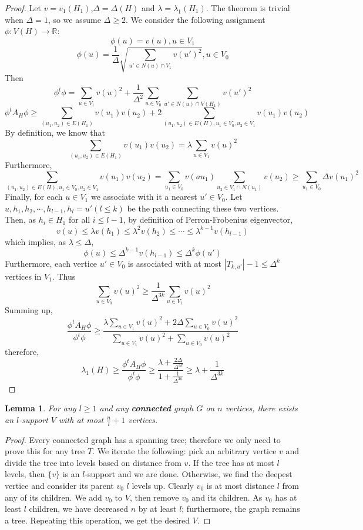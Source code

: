 \documentclass{article}
\theoremstyle{definition} %
\theoremstyle{plain} %
\newtheorem{lemma}{Lemma}
\begin{document}
\begin{proof}
Let $v = v_1(H_1)$,$\Delta = \Delta(H)$ and $\lambda = \lambda_1(H_1)$. The theorem is trivial when $\Delta = 1$, so we assume $\Delta\geq 2$. We consider the following assignment $\phi:V(H) \to\mathbb{R}$:
$$\phi(u) = v(u), u\in V_1$$
$$\phi(u) = \frac{1}{\Delta}\sqrt{\sum_{u'\in N(u)\cap V_1}v(u')^2}, u\in V_0$$
Then
$$\phi^t\phi = \sum_{u\in V_1}v(u)^2 + \frac{1}{\Delta^2}\sum_{u\in V_0}\sum_{u'\in N(u)\cap V(H_1)}v(u')^2$$
$$\phi^tA_H\phi \geq \sum_{(u_1,u_2)\in E(H_1)} v(u_1)v(u_2) + 2\sum_{(u_1,u_2)\in E(H),u_1\in V_0, u_2\in V_1}v(u_1)v(u_2)$$
By definition, we know that 
$$\sum_{(u_1,u_2)\in E(H_1)} v(u_1)v(u_2) = \lambda\sum_{u\in V_1}v(u)^2 $$
Furthermore,
$$\sum_{(u_1,u_2)\in E(H),u_1\in V_0, u_2\in V_1}v(u_1)v(u_2) = \sum_{u_1\in V_0}v(a u_1)\sum_{u_2\in V_1\cap N(u_1)}v(u_2)\geq  \sum_{u_1\in V_0}\Delta v(u_1)^2$$
Finally, for each $u\in V_1$ we associate with it a nearest $u'\in V_0$. Let $u, h_1,h_2,\cdots, h_{l-1}, h_l = u'(l\leq k)$ be the path connecting these two vertices. Then, as $h_i \in H_1$ for all $i \leq {l-1}$, by definition of Perron-Frobenius eigenvector,
$$v(u) \leq\lambda v(h_1) \leq \lambda^2v(h_2) \leq \cdots \leq \lambda^{k-1}v(h_{l-1})$$
which implies, as $\lambda \leq \Delta$,
$$\phi(u) \leq \Delta^{k-1}v(h_{l-1}) \leq \Delta^k\phi(u')$$
Furthermore, each vertice $u'\in V_0$ is associated with at most $|T_{k,u'}| - 1 \leq \Delta^k$ vertices in $V_1$. Thus
$$\sum_{u\in V_0}v(u)^2 \geq \frac{1}{\Delta^{3k}}\sum_{u\in V_1}v(u)^2$$
Summing up,
$$\frac{\phi^tA_H\phi}{\phi^t\phi} \geq \frac{\lambda\sum_{u\in V_1}v(u)^2+2\Delta\sum_{u\in V_0}v(u)^2}{\sum_{u\in V_1}v(u)^2+\sum_{u\in V_0}v(u)^2}$$
therefore,
$$\lambda_1(H) \geq \frac{\phi^tA_H\phi}{\phi^t\phi} \geq \frac{\lambda + \frac{2\Delta}{\Delta^{3k}} }{1+\frac{1}{\Delta^{3k}}} \geq \lambda + \frac{1}{\Delta^{3k}}$$
\end{proof}
\clearpage
\begin{lemma}
For any $l\geq 1$ and any \textbf{connected} graph $G$ on $n$ vertices, there exists an $l$-support $V$ with at most $\frac{n}{l}+1$ vertices.
\end{lemma}
\begin{proof}
Every connected graph has a spanning tree; therefore we only need to prove this for any tree $T$. We iterate the following: pick an arbitrary vertice $v$ and divide the tree into levels based on distance from $v$. If the tree has at most $l$ levels, then $\{v\}$ is an $l$-support and we are done. Otherwise, we find the deepest vertice and consider its parent $v_0$ $l$ levels up. Clearly $v_0$ is at most distance $l$ from any of its children. We add $v_0$ to $V$, then remove $v_0$ and its children. As $v_0$ has at least $l$ children, we have decreased $n$ by at least $l$; furthermore, the graph remains a tree. Repeating this operation, we get the desired $V$.
\end{proof}
\end{document}
